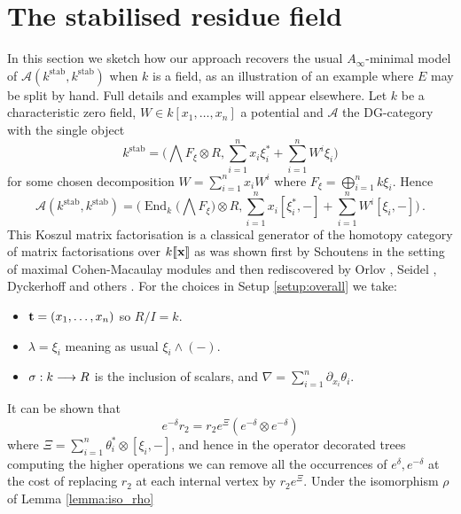 \documentclass[english,letter paper,12pt,leqno]{article}
\theoremstyle{example}
\newtheorem{remark}[theorem]{Remark}
\numberwithin{equation}{section}
\def\AA{\mathcal{A}}
\def\stab{\operatorname{stab}}
\def\be{\begin{equation}}
\def\ee{\end{equation}}
\DeclareMathOperator{\End}{End}
\begin{document}

\section{The stabilised residue field}\label{section:generator}

In this section we sketch how our approach recovers the usual $A_\infty$-minimal model \cite{seidel_hms, d0904.4713, efimov, sheridan} of $\AA(k^{\stab},k^{\stab})$ when $k$ is a field, as an illustration of an example where $E$ may be split by hand. Full details and examples will appear elsewhere. Let $k$ be a characteristic zero field, $W \in k[x_1,\ldots,x_n]$ a potential and $\AA$ the DG-category with the single object
\[
k^{\stab} = \big( \bigwedge F_\xi \otimes R, \sum_{i=1}^n x_i \xi_i^* + \sum_{i=1}^n W^i \xi_i \big)
\]
for some chosen decomposition $W = \sum_{i=1}^n x_i W^i$ where $F_\xi = \bigoplus_{i=1}^n k \xi_i$. Hence
\be
\AA(k^{\stab}, k^{\stab}) = \Big( \End_k\big(\bigwedge F_\xi\big) \otimes R, \sum_{i=1}^n x_i [\xi_i^*,-] + \sum_{i=1}^n W^i [\xi_i,-] \Big)\,.
\ee
This Koszul matrix factorisation is a classical generator of the homotopy category of matrix factorisations over $k\llbracket \bold{x} \rrbracket$ as was shown first by Schoutens in the setting of maximal Cohen-Macaulay modules \cite{schoutens} and then rediscovered by Orlov \cite{orlov}, Seidel \cite{seidel_hms}, Dyckerhoff \cite{d0904.4713} and others \cite[Proposition A.2]{keller}. For the choices in Setup \ref{setup:overall} we take:
\begin{itemize}
\item $\bold{t} = (x_1,\ldots,x_n)$ so $R/I = k$.
\item $\lambda = \xi_i$ meaning as usual $\xi_i \wedge (-)$.
\item $\sigma: k \longrightarrow R$ is the inclusion of scalars, and $\nabla = \sum_{i=1}^n \partial_{x_i} \theta_i$.
\end{itemize}
It can be shown that
\[
e^{-\delta} r_2 = r_2 e^{\Xi} ( e^{-\delta} \otimes e^{-\delta} )
\]
where $\Xi = \sum_{i=1}^n \theta_i^* \otimes [\xi_i, -]$, and hence in the operator decorated trees computing the higher operations we can remove all the occurrences of $e^{\delta}, e^{-\delta}$ at the cost of replacing $r_2$ at each internal vertex by $r_2 e^{\Xi}$. Under the isomorphism $\rho$ of Lemma \ref{lemma:iso_rho}
\end{document}
